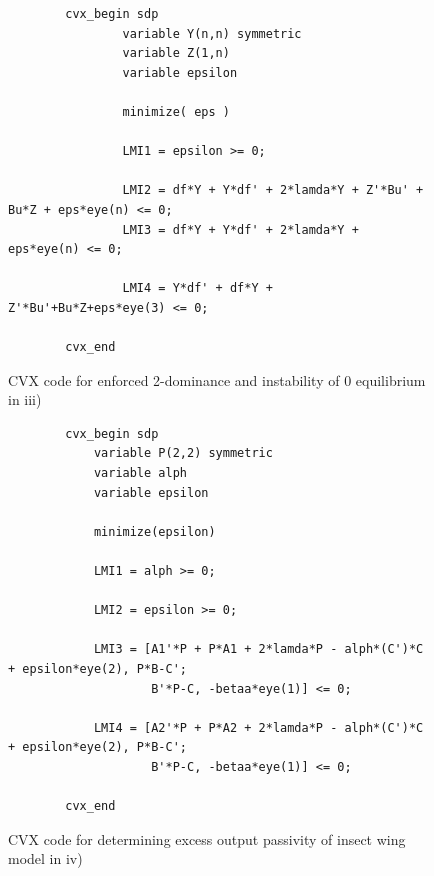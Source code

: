 \documentclass{article}
\begin{document}
\begin{figure}[H]
    \centering
    \begin{lstlisting}
        cvx_begin sdp
                variable Y(n,n) symmetric
                variable Z(1,n)
                variable epsilon
                
                minimize( eps )
                
                LMI1 = epsilon >= 0;
                
                LMI2 = df*Y + Y*df' + 2*lamda*Y + Z'*Bu' + Bu*Z + eps*eye(n) <= 0;
                LMI3 = df*Y + Y*df' + 2*lamda*Y + eps*eye(n) <= 0;
                
                LMI4 = Y*df' + df*Y + Z'*Bu'+Bu*Z+eps*eye(3) <= 0;
                
        cvx_end
    \end{lstlisting}
    \caption{CVX code for enforced 2-dominance and instability of 0 equilibrium in iii)}
    \label{fig:enforced_2_dominance_lmi}
\end{figure}

\begin{figure}[H]
    \centering
    \begin{lstlisting}
        cvx_begin sdp
            variable P(2,2) symmetric
            variable alph
            variable epsilon

            minimize(epsilon)

            LMI1 = alph >= 0;

            LMI2 = epsilon >= 0;
                    
            LMI3 = [A1'*P + P*A1 + 2*lamda*P - alph*(C')*C + epsilon*eye(2), P*B-C';
                    B'*P-C, -betaa*eye(1)] <= 0;

            LMI4 = [A2'*P + P*A2 + 2*lamda*P - alph*(C')*C + epsilon*eye(2), P*B-C';
                    B'*P-C, -betaa*eye(1)] <= 0;
        
        cvx_end
    \end{lstlisting}
    \caption{CVX code for determining excess output passivity of insect wing model in iv)}
    \label{fig:determining_excess_output_passivity_lmi}
\end{figure}
\end{document}
